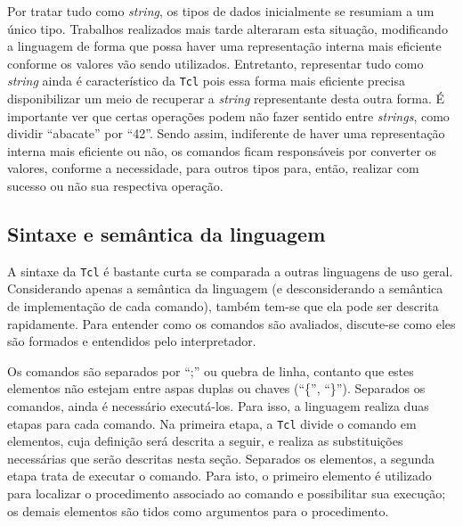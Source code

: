 Por tratar tudo como \textit{string}, os tipos de dados inicialmente
se resumiam a um único tipo. Trabalhos realizados mais tarde
\cite{sah_tc, tcl_bytecode} alteraram esta situação, modificando
a linguagem de forma que possa
haver uma representação interna mais eficiente conforme os valores vão
sendo utilizados. Entretanto, representar tudo como \textit{string} ainda
é característico da \texttt{Tcl} pois essa forma mais eficiente
precisa disponibilizar um meio de recuperar a \textit{string}
representante desta outra forma. É importante ver que certas
operações podem não fazer sentido entre \textit{strings}, como dividir
``abacate'' por ``42''. Sendo assim, indiferente de haver uma
representação interna mais eficiente ou não, os comandos ficam responsáveis
por converter os valores, conforme a necessidade, para outros
tipos para, então, realizar com sucesso ou não sua respectiva operação.


\subsection{Sintaxe e semântica da linguagem}

A sintaxe da \texttt{Tcl} é bastante curta se comparada a outras linguagens
de uso geral. Considerando apenas a semântica da linguagem (e
desconsiderando a semântica de implementação de cada comando), também
tem-se que ela pode ser descrita rapidamente. Para entender como os
comandos são avaliados, discute-se como eles são
formados e entendidos pelo interpretador.


Os comandos são separados por ``;'' ou quebra de linha, contanto que
estes elementos não estejam entre aspas duplas ou chaves (``\{'',
``\}''). Separados os comandos, ainda é necessário executá-los. Para
isso, a linguagem realiza duas etapas para cada comando. Na primeira
etapa, a \texttt{Tcl} divide o comando em elementos, cuja definição será
descrita a seguir, e realiza as substituições necessárias que serão
descritas nesta seção. Separados os elementos, a segunda etapa trata de
executar o comando. Para isto, o primeiro elemento é utilizado
para localizar o procedimento associado ao comando e possibilitar sua
execução; os demais elementos são tidos como argumentos para o
procedimento.

